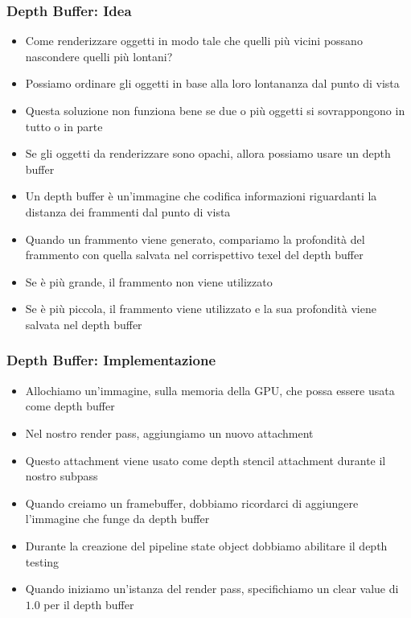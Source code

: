 \begin{frame}
\frametitle{Depth Buffer: Idea}
\begin{itemize}
\item Come renderizzare oggetti in modo tale che quelli più vicini possano nascondere quelli più lontani?
\item Possiamo ordinare gli oggetti in base alla loro lontananza dal punto di vista
\item Questa soluzione non funziona bene se due o più oggetti si sovrappongono in tutto o in parte
\item Se gli oggetti da renderizzare sono opachi, allora possiamo usare un depth buffer
\item Un depth buffer è un'immagine che codifica informazioni riguardanti la distanza dei frammenti dal punto di vista
\item Quando un frammento viene generato, compariamo la profondità del frammento con quella salvata nel corrispettivo texel del depth buffer
\item Se è più grande, il frammento non viene utilizzato
\item Se è più piccola, il frammento viene utilizzato e la sua profondità viene salvata nel depth buffer
\end{itemize}
\end{frame}

\begin{frame}
\frametitle{Depth Buffer: Implementazione}
\begin{itemize}
\item Allochiamo un'immagine, sulla memoria della GPU, che possa essere usata come depth buffer
\item Nel nostro render pass, aggiungiamo un nuovo attachment
\item Questo attachment viene usato come depth stencil attachment durante il nostro subpass
\item Quando creiamo un framebuffer, dobbiamo ricordarci di aggiungere l'immagine che funge da depth buffer
\item Durante la creazione del pipeline state object dobbiamo abilitare il depth testing
\item Quando iniziamo un'istanza del render pass, specifichiamo un clear value di $1.0$ per il depth buffer
\end{itemize}
\end{frame}
